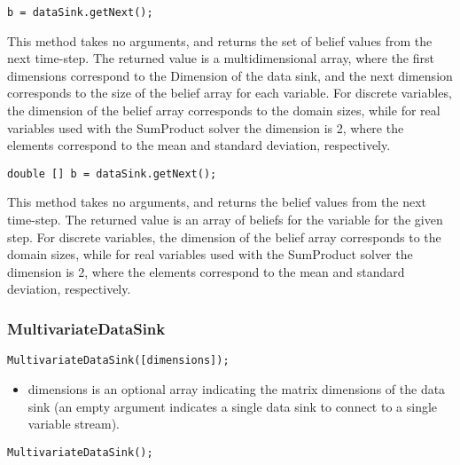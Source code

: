 

\ifmatlab
\begin{lstlisting}
b = dataSink.getNext();
\end{lstlisting}

This method takes no arguments, and returns the set of belief values from the next time-step.  The returned value is a multidimensional array, where the first dimensions correspond to the Dimension of the data sink, and the next dimension corresponds to the size of the belief array for each variable.  For discrete variables, the dimension of the belief array corresponds to the domain sizes, while for real variables used with the SumProduct solver the dimension is 2, where the elements correspond to the mean and standard deviation, respectively.

\fi

\ifjava
\begin{lstlisting}
double [] b = dataSink.getNext();
\end{lstlisting}

This method takes no arguments, and returns the belief values from the next time-step.  The returned value is an array of beliefs for the variable for the given step.  For discrete variables, the dimension of the belief array corresponds to the domain sizes, while for real variables used with the SumProduct solver the dimension is 2, where the elements correspond to the mean and standard deviation, respectively.
\fi

\subsubsection{MultivariateDataSink}


\ifmatlab
\begin{lstlisting}
MultivariateDataSink([dimensions]);
\end{lstlisting}

\begin{itemize}
\item dimensions is an optional array indicating the matrix dimensions of the data sink (an empty argument indicates a single data sink to connect to a single variable stream).
\end{itemize}
\fi

\ifjava
\begin{lstlisting}
MultivariateDataSink();
\end{lstlisting}
\fi

